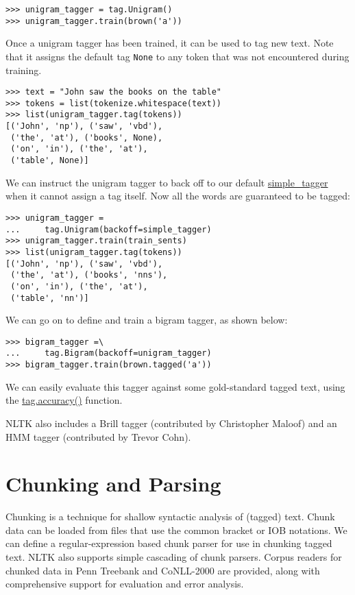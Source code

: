 \documentclass[11pt]{article}
\begin{document}
{\small\begin{verbatim}
>>> unigram_tagger = tag.Unigram()
>>> unigram_tagger.train(brown('a'))
\end{verbatim}}
    
\noindent
Once a unigram tagger has been trained, it can be used to tag new text.
Note that it assigns the default tag \texttt{None} to any token that was not
encountered during training.

{\small\begin{verbatim}
>>> text = "John saw the books on the table"
>>> tokens = list(tokenize.whitespace(text))
>>> list(unigram_tagger.tag(tokens))
[('John', 'np'), ('saw', 'vbd'),
 ('the', 'at'), ('books', None),
 ('on', 'in'), ('the', 'at'),
 ('table', None)]
\end{verbatim}}
    
\noindent
We can instruct the unigram tagger to back off to our default
\url{simple_tagger} when it cannot assign a tag itself.  Now all
the words are guaranteed to be tagged:

{\small\begin{verbatim}
>>> unigram_tagger =
...     tag.Unigram(backoff=simple_tagger)
>>> unigram_tagger.train(train_sents)
>>> list(unigram_tagger.tag(tokens))
[('John', 'np'), ('saw', 'vbd'),
 ('the', 'at'), ('books', 'nns'),
 ('on', 'in'), ('the', 'at'),
 ('table', 'nn')]
\end{verbatim}}

\noindent
We can go on to define and train a bigram tagger, as shown below:

{\small\begin{verbatim}
>>> bigram_tagger =\
...     tag.Bigram(backoff=unigram_tagger)
>>> bigram_tagger.train(brown.tagged('a'))
\end{verbatim}}

\noindent
We can easily evaluate this tagger against some gold-standard tagged
text, using the \url{tag.accuracy()} function.

NLTK also includes a Brill tagger (contributed by Christopher
Maloof) and an HMM tagger (contributed by Trevor Cohn).

\section{Chunking and Parsing}

Chunking is a technique for shallow syntactic analysis of (tagged)
text.  Chunk data can be loaded from files that use the common bracket or
IOB notations.  We can define a regular-expression based chunk parser
for use in chunking tagged text.  NLTK also supports simple cascading
of chunk parsers.  Corpus readers for chunked data in Penn Treebank
and CoNLL-2000 are provided, along with comprehensive support for
evaluation and error analysis.
\end{document}
